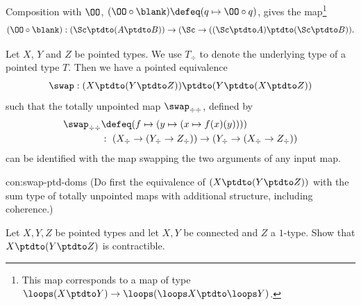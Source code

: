 Composition with $\OO$, \ie $(\OO\circ\blank)\defeq(q\mapsto \OO\circ q)$,
gives the map\footnote{
This map corresponds to a map of type
$\loops(X\ptdto Y) \to \loops(\loops X\ptdto \loops Y)$.} 
\[
(\OO\circ\blank): (\Sc\ptdto(A\ptdto B))\to
(\Sc\to((\Sc\ptdto A)\ptdto(\Sc\ptdto B)).
\]

\begin{construction}\label{con:swap-ptd-doms}
Let $X$, $Y$ and $Z$ be pointed types. We use $T_\div$ to
denote the underlying type of a pointed type $T$.
Then we have a pointed equivalence 
\[
\swap: (X\ptdto (Y\ptdto Z)) \ptdto (Y\ptdto (X\ptdto Z))
\] 
such that the totally unpointed map $\swap_{\div\div}$, defined by
\begin{align*}
\swap_{\div\div}&\defeq (f\mapsto(y\mapsto (x\mapsto f(x)(y)))) \\
 &:~(X_\div\to (Y_\div\to Z_\div))\to(Y_\div\to (X_\div\to Z_\div))
\end{align*}
can be identified with the map swapping the two arguments of any input map. 
\end{construction}
\begin{implementation}{con:swap-ptd-doms}
 (Do first the equivalence of $(X\ptdto (Y\ptdto Z))$
with the sum type of totally unpointed maps with additional structure,
including coherence.)
\end{implementation}

\begin{xca}\label{xca:allptd-S1-contractible}
Let $X,Y,Z$ be pointed types and let $X,Y$ be connected
and $Z$ a $1$-type.
Show that $X\ptdto(Y\ptdto Z)$ is contractible.
\end{xca}

